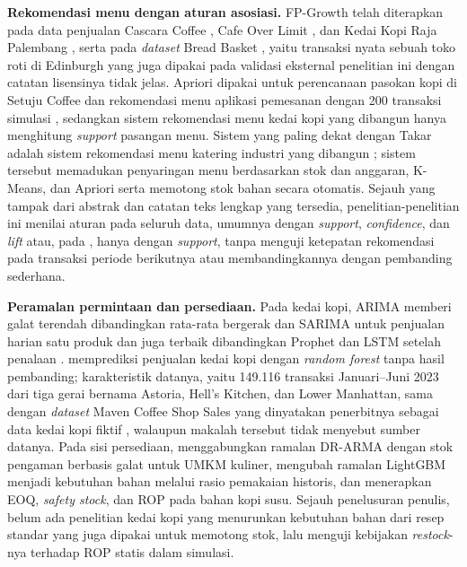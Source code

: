 \textbf{Rekomendasi menu dengan aturan asosiasi.} FP-Growth telah diterapkan pada data penjualan Cascara Coffee \citep*{fadillah2021data}, Cafe Over Limit \citep*{hasan2023utilization}, dan Kedai Kopi Raja Palembang \citep*{pratama2025food}, serta pada \textit{dataset} Bread Basket \citep*{sihombing2026analisis}, yaitu transaksi nyata sebuah toko roti di Edinburgh \citep*{mittal2020bread} yang juga dipakai pada validasi eksternal penelitian ini dengan catatan lisensinya tidak jelas. Apriori dipakai untuk perencanaan pasokan kopi di Setuju Coffee \citep*{nasution2025application} dan rekomendasi menu aplikasi pemesanan dengan 200 transaksi simulasi \citep*{yudanto2025penerapan}, sedangkan sistem rekomendasi menu kedai kopi yang dibangun \citet*{rahmatika2025sistem} hanya menghitung \textit{support} pasangan menu. Sistem yang paling dekat dengan Takar adalah sistem rekomendasi menu katering industri yang dibangun \citet*{pratama2026automatic}; sistem tersebut memadukan penyaringan menu berdasarkan stok dan anggaran, K-Means, dan Apriori serta memotong stok bahan secara otomatis. Sejauh yang tampak dari abstrak dan catatan teks lengkap yang tersedia, penelitian-penelitian ini menilai aturan pada seluruh data, umumnya dengan \textit{support}, \textit{confidence}, dan \textit{lift} atau, pada \citet*{rahmatika2025sistem}, hanya dengan \textit{support}, tanpa menguji ketepatan rekomendasi pada transaksi periode berikutnya atau membandingkannya dengan pembanding sederhana.

\textbf{Peramalan permintaan dan persediaan.} Pada kedai kopi, ARIMA memberi galat terendah dibandingkan rata-rata bergerak dan SARIMA untuk penjualan harian satu produk \citep*{azzahra2025forecasting} dan juga terbaik dibandingkan Prophet dan LSTM setelah penalaan \citep*{pattisealnno2026comparative}. \citet*{windrasari2025predictive} memprediksi penjualan kedai kopi dengan \textit{random forest} tanpa hasil pembanding; karakteristik datanya, yaitu 149.116 transaksi Januari--Juni 2023 dari tiga gerai bernama Astoria, Hell's Kitchen, dan Lower Manhattan, sama dengan \textit{dataset} Maven Coffee Shop Sales yang dinyatakan penerbitnya sebagai data kedai kopi fiktif \citep*{mavenanalytics2023coffee}, walaupun makalah tersebut tidak menyebut sumber datanya. Pada sisi persediaan, \citet*{lauren2026optimizing} menggabungkan ramalan DR-ARMA dengan stok pengaman berbasis galat untuk UMKM kuliner, \citet*{piewthongngam2026aienabled} mengubah ramalan LightGBM menjadi kebutuhan bahan melalui rasio pemakaian historis, dan \citet*{nurhalizapratiwi2025analisis} menerapkan EOQ, \textit{safety stock}, dan ROP pada bahan kopi susu. Sejauh penelusuran penulis, belum ada penelitian kedai kopi yang menurunkan kebutuhan bahan dari resep standar yang juga dipakai untuk memotong stok, lalu menguji kebijakan \textit{restock}-nya terhadap ROP statis dalam simulasi.

